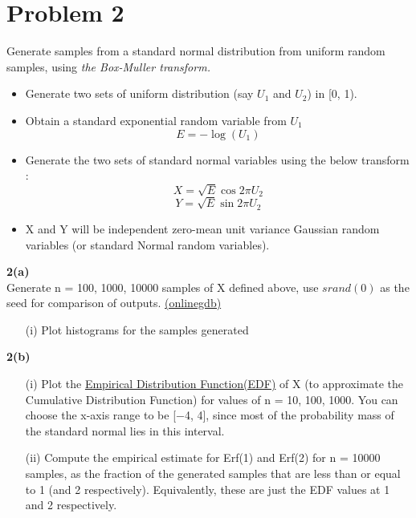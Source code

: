\documentclass[titlepage, 11pt]{article}
\begin{document}
\newpage
\section{Problem 2}
Generate samples from a standard normal distribution from uniform random samples, using \emph{the Box-Muller transform.}
\begin{itemize}
    \item Generate two sets of uniform distribution (say $U_1$ and $U_2$) in [0, 1).
    \item Obtain a standard exponential random variable from $U_1$ 
    \begin{equation}
        E = - \log(U_1)
    \end{equation}
    \item Generate the two sets of standard normal variables using the below transform : 
    \begin{equation}
        X = \sqrt{E} \cos{2 \pi U_2} 
    \end{equation}
    \begin{equation}
        Y = \sqrt{E} \sin{2 \pi U_2} 
    \end{equation}
    \item X and Y will be independent zero-mean unit variance Gaussian random variables (or standard Normal random variables).
\end{itemize}
\textbf{2(a)} \\
Generate n = 100, 1000, 10000 samples of X defined above, use $srand(0)$ as the seed for comparison of outputs. \href{https://www.onlinegdb.com/online_c_compiler}{(onlinegdb)}
\begin{itemize}
    \item [(i)] Plot histograms for the samples generated \\
\end{itemize}
\textbf{2(b)} \\
\begin{itemize}
    \item [(i)] Plot the \href{https://en.wikipedia.org/wiki/Empirical_distribution_function}{Empirical Distribution Function(EDF)} of X (to approximate the Cumulative Distribution Function) for values of n = 10, 100, 1000. You can choose the x-axis range to be [−4, 4], since most of the probability mass of the standard normal lies in this interval.
    \item [(ii)]Compute the empirical estimate for Erf(1) and Erf(2) for n = 10000 samples, as the fraction of the generated samples that are less than or equal to 1 (and 2 respectively). Equivalently, these are just the EDF values at 1 and 2 respectively.
\end{itemize}
\end{document}
